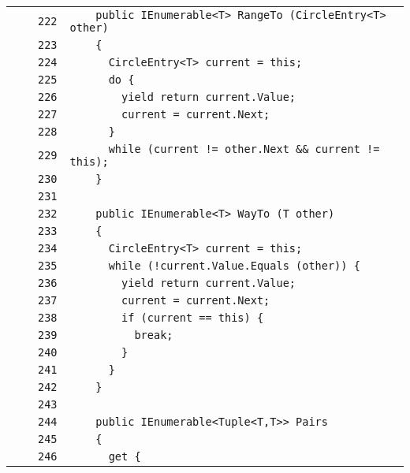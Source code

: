 \documentclass[a4paper,10pt]{article}
\begin{document}
\begin{longtable}[l]{lrrl}
\cellcolor{gray} &  & \verb~222~ & \verb~    public IEnumerable<T> RangeTo (CircleEntry<T> other)~\\
\cellcolor{gray} &  & \verb~223~ & \verb~    {~\\
\cellcolor{gray} &  & \verb~224~ & \verb~      CircleEntry<T> current = this;~\\
\cellcolor{gray} &  & \verb~225~ & \verb~      do {~\\
\cellcolor{gray} &  & \verb~226~ & \verb~        yield return current.Value;~\\
\cellcolor{gray} &  & \verb~227~ & \verb~        current = current.Next;~\\
\cellcolor{gray} &  & \verb~228~ & \verb~      }~\\
\cellcolor{gray} &  & \verb~229~ & \verb~      while (current != other.Next && current != this);~\\
\cellcolor{gray} &  & \verb~230~ & \verb~    }~\\
\cellcolor{gray} &  & \verb~231~ & \verb~~\\
\cellcolor{gray} &  & \verb~232~ & \verb~    public IEnumerable<T> WayTo (T other)~\\
\cellcolor{gray} &  & \verb~233~ & \verb~    {~\\
\cellcolor{gray} &  & \verb~234~ & \verb~      CircleEntry<T> current = this;~\\
\cellcolor{gray} &  & \verb~235~ & \verb~      while (!current.Value.Equals (other)) {~\\
\cellcolor{gray} &  & \verb~236~ & \verb~        yield return current.Value;~\\
\cellcolor{gray} &  & \verb~237~ & \verb~        current = current.Next;~\\
\cellcolor{gray} &  & \verb~238~ & \verb~        if (current == this) {~\\
\cellcolor{gray} &  & \verb~239~ & \verb~          break;~\\
\cellcolor{gray} &  & \verb~240~ & \verb~        }~\\
\cellcolor{gray} &  & \verb~241~ & \verb~      }~\\
\cellcolor{gray} &  & \verb~242~ & \verb~    }~\\
\cellcolor{gray} &  & \verb~243~ & \verb~~\\
\cellcolor{gray} &  & \verb~244~ & \verb~    public IEnumerable<Tuple<T,T>> Pairs~\\
\cellcolor{gray} &  & \verb~245~ & \verb~    {~\\
\cellcolor{gray} &  & \verb~246~ & \verb~      get {~\\

\end{longtable}
\end{document}

